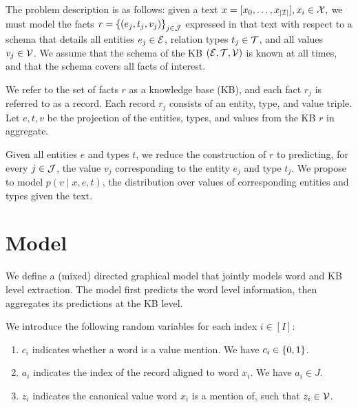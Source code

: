 \documentclass[12pt]{article}
\begin{document}
The problem description is as follows:
given a text $x = [x_0, \ldots, x_{|\mathcal{I}|}],x_i \in \mathcal{X},$ we must model the facts
$r = \left\{(e_j, t_j, v_j)\right\}_{j \in \mathcal{J}}$ expressed in that text
with respect to a schema that details all entities $e_j \in \mathcal{E}$,
relation types $t_j \in \mathcal{T}$, and all values $v_j \in \mathcal{V}$.
We assume that the schema of the KB $(\mathcal{E}, \mathcal{T}, \mathcal{V})$ is known at all times,
and that the schema covers all facts of interest.

We refer to the set of facts $r$ as a knowledge base (KB),
and each fact $r_j$ is referred to as a record.
Each record $r_j$ consists of an entity, type, and value triple. 
Let $e,t,v$ be the projection of the entities, types, and values
from the KB $r$ in aggregate.

Given all entities $e$ and types $t$,
we reduce the construction of $r$ to predicting, for every $j\in \mathcal{J}$,
the value $v_j$ corresponding to the entity $e_j$ and type $t_j$.
We propose to model $p(v \mid x, e, t)$,
the distribution over values of corresponding entities and types given the text.

\section{Model}
We define a (mixed) directed graphical model that jointly models 
word and KB level extraction. 
The model first predicts the word level information,
then aggregates its predictions at the KB level.

We introduce the following random variables for each index $i \in [I]$:
\begin{enumerate}
\item $c_i$ indicates whether a word is a value mention.
    We have $c_i \in \left\{0,1\right\}$.
\item $a_i$ indicates the index of the record aligned to word $x_i$.
    We have $a_i \in J$.
\item $z_i$ indicates the canonical value word $x_i$ is a mention of,
    such that $z_i \in \mathcal{V}$.
\end{enumerate}
\end{document}
